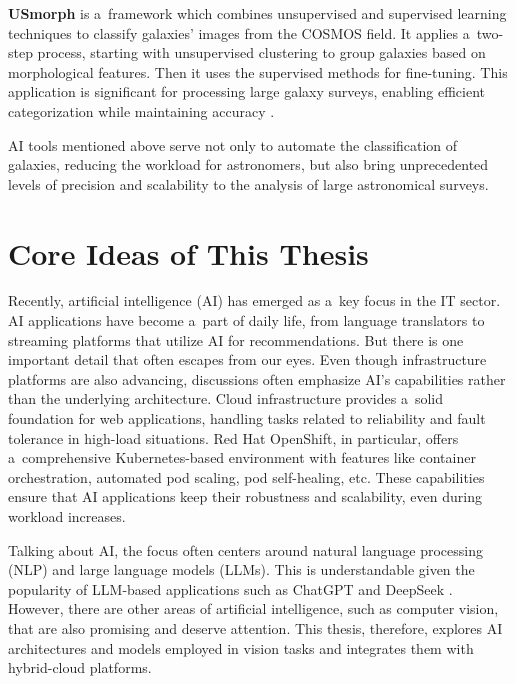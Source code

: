 \medskip

\textbf{USmorph} is a~framework which combines unsupervised and supervised learning techniques to classify galaxies' images from the COSMOS field. It applies a~two-step process, starting with unsupervised clustering to group galaxies based on morphological features. Then it uses the supervised methods for fine-tuning. This application is significant for processing large galaxy surveys, enabling efficient categorization while maintaining accuracy \cite{song2024usmorphupdatedframeworkautomatic}.

\medskip

AI tools mentioned above serve not only to automate the classification of galaxies, reducing the workload for astronomers, but also bring unprecedented levels of precision and scalability to the analysis of large astronomical surveys.

\chapter{Core Ideas of This Thesis}
\label{chapter:core-idea}

Recently, artificial intelligence (AI) has emerged as a~key focus in the IT sector. AI applications have become a~part of daily life, from language translators to streaming platforms that utilize AI for recommendations. But there is one important detail that often escapes from our eyes. Even though infrastructure platforms are also advancing, discussions often emphasize AI's capabilities rather than the underlying architecture. Cloud infrastructure provides a~solid foundation for web applications, handling tasks related to reliability and fault tolerance in high-load situations. Red Hat OpenShift, in particular, offers a~comprehensive Kubernetes-based environment with features like container orchestration, automated pod scaling, pod self-healing, etc. These capabilities ensure that AI applications keep their robustness and scalability, even during workload increases.

Talking about AI, the focus often centers around natural language processing (NLP) and large language models (LLMs). This is understandable given the popularity of LLM-based applications such as ChatGPT \cite{openai2024gpt4technicalreport} and DeepSeek \cite{deepseekai2025deepseekr1incentivizingreasoningcapability}. However, there are other areas of artificial intelligence, such as computer vision, that are also promising and deserve attention. This thesis, therefore, explores AI architectures and models employed in vision tasks and integrates them with hybrid-cloud platforms.

